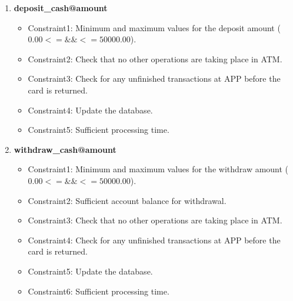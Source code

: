 \documentclass[12pt]{article}
\begin{document}
\begin{enumerate}
    \item \textbf{deposit\_cash@amount}
        \begin{itemize}
            \item Constraint1: Minimum and maximum values for the deposit amount ($0.00<= \&\& <=50000.00$).
            \item Constraint2: Check that no other operations are taking place in ATM.
            \item Constraint3: Check for any unfinished transactions at APP before the card is returned.
            \item Constraint4: Update the database.
            \item Constraint5: Sufficient processing time.
        \end{itemize}
        
    \item \textbf{withdraw\_cash@amount}
        \begin{itemize}
            \item Constraint1: Minimum and maximum values for the withdraw amount ($0.00<= \&\& <=50000.00$).
            \item Constraint2: Sufficient account balance for withdrawal.
            \item Constraint3: Check that no other operations are taking place in ATM.
            \item Constraint4: Check for any unfinished transactions at APP before the card is returned.
            \item Constraint5: Update the database.
            \item Constraint6: Sufficient processing time.
        \end{itemize}
\end{enumerate}
\end{document}
